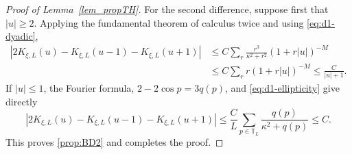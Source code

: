 \documentclass[10pt,reqno]{article}
\newcommand{\T}{\mathbb T}
\theoremstyle{plain} %
\theoremstyle{remark}
\numberwithin{equation}{section}
\begin{document}
\begin{proof}[Proof of Lemma~\ref{lem_propTH}]
For the second difference, suppose first that \(|u|\geq2\).   Applying the fundamental theorem of calculus twice and using
\eqref{eq:d1-dyadic},
\begin{align*}
 |2K_{\xi,L}(u)-K_{\xi,L}(u-1)-K_{\xi,L}(u+1)|
 &\leq C\sum_r\frac{r^3}{\kappa^2+r^2}(1+r|u|)^{-M}\\
 &\leq C\sum_r r(1+r|u|)^{-M}
 \leq\frac{C}{|u|+1}.
\end{align*}
If \(|u|\leq1\), the Fourier formula, \(2-2\cos p=3q(p)\), and
\eqref{eq:d1-ellipticity} give directly
\[
 |2K_{\xi,L}(u)-K_{\xi,L}(u-1)-K_{\xi,L}(u+1)|
 \leq\frac{C}{L}\sum_{p\in\T_L}
 \frac{q(p)}{\kappa^2+q(p)}\leq C.
\]
This proves \eqref{prop:BD2} and completes the proof.
\end{proof}

\printbibliography 
\end{document}
